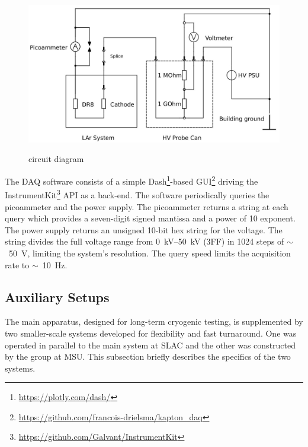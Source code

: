\documentclass[a4paper,12pt]{article}
\begin{document}
\begin{figure}[ht]
	{\includegraphics[width=0.85\linewidth]{circuit.jpg}}
	\caption{circuit diagram}
	\label{fig:circuit}
\end{figure}


The DAQ software consists of a simple Dash\footnote{\href{https://plotly.com/dash/}{https://plotly.com/dash/}}-based GUI\footnote{\href{https://github.com/francois-drielsma/kapton_daq}{https://github.com/francois-drielsma/kapton\_daq}} driving the InstrumentKit\footnote{\href{https://github.com/Galvant/InstrumentKit}{https://github.com/Galvant/InstrumentKit}} API as a back-end. 
The software periodically queries the picoammeter and the power supply. 
The picoammeter returns a string at each query which provides a seven-digit signed mantissa and a power of 10 exponent. 
The power supply returns an unsigned 10-bit hex string for the voltage. 
The string divides the full voltage range from \SIrange{0}{50}{\kilo\volt} (3FF) in 1024 steps of $\sim$~\SI{50}{\volt}, limiting the system's resolution. The query speed limits the acquisition rate to $\sim$~\SI{10}{\hertz}.




\subsection{Auxiliary Setups}
\label{sec:auxsetup}
The main apparatus, designed for long-term cryogenic testing, is supplemented by two smaller-scale systems developed for flexibility and fast turnaround. One was operated in parallel to the main system at SLAC and the other was constructed by the group at MSU. This subsection briefly describes the specifics of the two systems.
\end{document}
